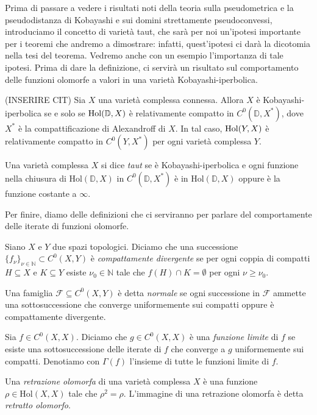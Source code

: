 Prima di passare a vedere i risultati noti della teoria sulla pseudometrica e la pseudodistanza di Kobayashi e sui domini strettamente pseudoconvessi, introduciamo il concetto di varietà taut, che sarà per noi un'ipotesi importante per i teoremi che andremo a dimostrare: infatti, quest'ipotesi ci darà la dicotomia nella tesi del teorema. Vedremo anche con un esempio l'importanza di tale ipotesi. Prima di dare la definizione, ci servirà un risultato sul comportamento delle funzioni olomorfe a valori in una varietà Kobayashi-iperbolica.

\begin{prop} \label{alex}
    (INSERIRE CIT) Sia $X$ una varietà complessa connessa. Allora $X$ è Kobayashi-iperbolica se e solo se $\text{\normalfont{Hol}}(\mathbb{D},X)$ è relativamente compatto in $C^0(\mathbb{D},X^*)$, dove $X^*$ è la compattificazione di Alexandroff di $X$. In tal caso, $\text{\normalfont{Hol}}(Y,X)$ è relativamente compatto in $C^0(Y,X^*)$ per ogni varietà complessa $Y$.
\end{prop}

\begin{defn}
    Una varietà complessa $X$ si dice \textit{taut} se è Kobayashi-iperbolica e ogni funzione nella chiusura di $\text{Hol}(\mathbb{D},X)$ in $C^0(\mathbb{D},X^*)$ è in $\text{Hol}(\mathbb{D},X)$ oppure è la funzione costante a $\infty$.
\end{defn}

Per finire, diamo delle definizioni che ci serviranno per parlare del comportamente delle iterate di funzioni olomorfe.

\begin{defn}
    Siano $X$ e $Y$ due spazi topologici. Diciamo che una successione $\{f_{\nu}\}_{\nu \in \mathbb{N}} \subset C^0(X,Y)$ è \textit{compattamente divergente} se per ogni coppia di compatti $H\subseteq X$ e $K\subseteq Y$ esiste $\nu_0 \in \mathbb{N}$ tale che $f(H)\cap K=\emptyset$ per ogni $\nu \ge \nu_0$.

    Una famiglia $\mathcal{F} \subseteq C^0(X,Y)$ è detta \textit{normale} se ogni successione in $\mathcal{F}$ ammette una sottosuccessione che converge uniformemente sui compatti oppure è compattamente divergente.
\end{defn}

\begin{defn}
    Sia $f\in C^0(X,X)$. Diciamo che $g\in C^0(X,X)$ è una \textit{funzione limite} di $f$ se esiste una sottosuccessione delle iterate di $f$ che converge a $g$ uniformemente sui compatti. Denotiamo con $\Gamma(f)$ l'insieme di tutte le funzioni limite di $f$.
\end{defn}

\begin{defn}
    Una \textit{retrazione olomorfa} di una varietà complessa $X$ è una funzione $\rho\in\text{Hol}(X,X)$ tale che $\rho^2=\rho$. L'immagine di una retrazione olomorfa è detta \textit{retratto olomorfo}.
\end{defn}